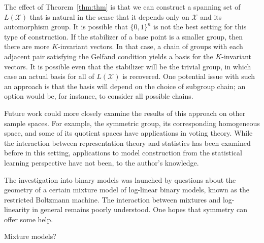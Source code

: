 \documentclass[cclicense]{hmcthesis}
\providecommand*{\xs}{\mathcal X}
\numberwithin{equation}{chapter}
\numberwithin{thmcounter}{chapter}
\begin{document}
    The effect of Theorem~\ref{thm:thm} is that we can construct a spanning set
    of $L(\xs)$ that is natural in the sense that it depends only on $\xs$ and
    its automorphism group.  It is possible that $\{0, 1\}^n$ is not the best
    setting for this type of construction.  If the stabilizer of a base point is
    a smaller group, then there are more $K$-invariant vectors.  In that case, a
    chain of groups with each adjacent pair satisfying the Gelfand condition
    yields a basis for the $K$-invariant vectors.  It is possible even that the
    stabilizer will be the trivial group, in which case an actual basis for all
    of $L(\xs)$ is recovered.  One potential issue with such an approach is that
    the basis will depend on the choice of subgroup chain; an option would be,
    for instance, to consider all possible chains.

    Future work could more closely examine the results of this approach on other
    sample spaces.  For example, the symmetric group, its corresponding
    homogeneous space, and some of its quotient spaces have applications in
    voting theory.  While the interaction between representation theory and
    statistics has been examined before in this setting, applications to model
    construction from the statistical learning perspective have not been, to the
    author's knowledge.

    The investigation into binary models was launched by questions about the
    geometry of a certain mixture model of log-linear binary models, known as
    the restricted Boltzmann machine.  The interaction between mixtures and
    log-linearity in general remains poorly understood.  One hopes that symmetry
    can offer some help.

    Mixture models?

\appendix




\backmatter




\end{document}
